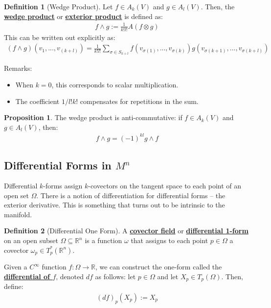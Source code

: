 \documentclass[11pt]{scrartcl}
\newcommand{\R}[0]{\mathbb{R}}
\theoremstyle{definition}
\newtheorem{definition}{Definition}
\newtheorem{prop}{Proposition}
\theoremstyle{remark}
\newcommand{\dfn}[1]{\textbf{\underline{#1}}}
\begin{document}
{\begin{definition}[Wedge Product]
	Let $f \in A_k(V)$ and $g \in A_l(V)$. Then, the \dfn{wedge product} or \dfn{exterior product} is defined as:
	\begin{align*}
		f \wedge g := \frac{1}{k!l!} A(f \otimes g) 
	\end{align*}
	This can be written out explicitly as: 
	\begin{align*}
		(f \wedge g)(v_1, ..., v_{(k+l)}) = \frac{1}{k!l!} \sum_{ \sigma \in S_{k+l}} f(v_{\sigma(1)}, ..., v_{\sigma(k)} ) g(v_{\sigma(k+1)}, ..., v_{\sigma(k+l)}) 
	\end{align*}
\end{definition}
Remarks: 
\begin{itemize}[noitemsep]
	\item When $k=0$, this corresponds to scalar multiplication. 
	\item The coefficient $1/l!k!$ compensates for repetitions in the sum. 
\end{itemize}

\begin{prop}
	The wedge product is anti-commutative: if $f \in A_k(V)$ and $g \in A_l (V)$, then: 
	\begin{align*}
		f \wedge g = (-1)^{kl} g \wedge f
	\end{align*} 
\end{prop}


\subsection{Differential Forms in $M^n$}
Differential $k$-forms assign $k$-covectors on the tangent space to each point of an open set $\Omega$. There is a notion of differentiation for differential forms -- the exterior derivative. This is something that turns out to be intrinsic to the manifold. 

\begin{definition}[Differential One Form]
	A \dfn{covector field} or \dfn{differential 1-form} on an open subset $\Omega \subseteq \R^n$ is a function $\omega$ that assigns to each point $p \in \Omega$ a covector $\omega_p \in T_p^*(\R^n)$. 
\end{definition}
Given a $C^\infty$ function $f: \Omega \rightarrow \R$, we can construct the one-form called the \dfn{differential of $f$}, denoted $df$ as follows: let $p \in \Omega$ and let $X_p \in T_p(\Omega)$. Then, define: 
\begin{align*}
	(df)_p (X_p) := X_p 
\end{align*}

}
\end{document}
